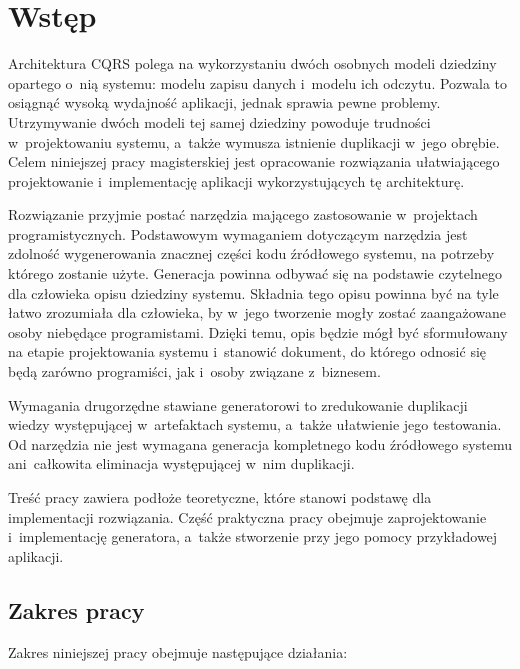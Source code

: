 \chapter{Wstęp} \label{chap:intro}

Architektura CQRS polega na wykorzystaniu dwóch osobnych modeli dziedziny opartego o~nią systemu: modelu zapisu danych i~modelu ich odczytu.
Pozwala to osiągnąć wysoką wydajność aplikacji, jednak sprawia pewne problemy.
Utrzymywanie dwóch modeli tej samej dziedziny powoduje trudności w~projektowaniu systemu, a~także wymusza istnienie duplikacji w~jego obrębie.
Celem niniejszej pracy magisterskiej jest opracowanie rozwiązania ułatwiającego projektowanie i~implementację aplikacji wykorzystujących tę architekturę.

Rozwiązanie przyjmie postać narzędzia mającego zastosowanie w~projektach programistycznych.
Podstawowym wymaganiem dotyczącym narzędzia jest zdolność wygenerowania znacznej części kodu źródłowego systemu, na potrzeby którego zostanie użyte.
Generacja powinna odbywać się na podstawie czytelnego dla człowieka opisu dziedziny systemu.
Składnia tego opisu powinna być na tyle łatwo zrozumiała dla człowieka, by w~jego tworzenie mogły zostać zaangażowane osoby niebędące programistami.
Dzięki temu, opis będzie mógł być sformułowany na etapie projektowania systemu i~stanowić dokument, do którego odnosić się będą zarówno programiści, jak i~osoby związane z~biznesem.

Wymagania drugorzędne stawiane generatorowi to zredukowanie duplikacji wiedzy występującej w~artefaktach systemu, a~także ułatwienie jego testowania.
Od narzędzia nie jest wymagana generacja kompletnego kodu źródłowego systemu ani~całkowita eliminacja występującej w~nim duplikacji.

Treść pracy zawiera podłoże teoretyczne, które stanowi podstawę dla implementacji rozwiązania.
Część praktyczna pracy obejmuje zaprojektowanie i~implementację generatora, a~także stworzenie przy jego pomocy przykładowej aplikacji.



\section{Zakres pracy} \label{sec:intro:scope}

Zakres niniejszej pracy obejmuje następujące działania:


